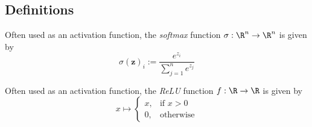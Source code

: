 \subsection{Definitions}\label{d165fe8}

\label{fdaba2f}

Often used as an activation function, the \textit{softmax} function
$\sigma:\R^n\to\R^n$ is given by
$$
  \sigma(\mathbf z)_i:=\frac{e^{z_i}}{\sum_{j=1}^ne^{z_j}}
$$

\label{fe694c2}

Often used as an activation function, the \textit{ReLU} function $f:\R\to\R$ is
given by
$$
  x\mapsto\begin{cases}x,&\text{if }x>0\\0,&\text{otherwise}\end{cases}
$$
